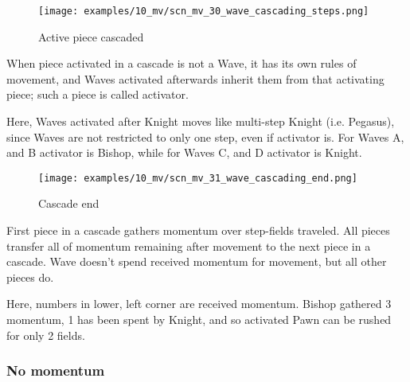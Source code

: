 \clearpage %

\vspace*{-2.1\baselineskip}
\noindent
\begin{figure}[h]
\texttt{[image: examples/10\_mv/scn\_mv\_30\_wave\_cascading\_steps.png]}
\vspace*{-1.4\baselineskip}
\caption{Active piece cascaded}
\label{fig:scn_mv_30_wave_cascading_steps}
\end{figure}

\vspace*{-0.4\baselineskip}
When piece activated in a cascade is not a Wave, it has its own rules of movement, and
Waves activated afterwards inherit them from that activating piece; such a piece is
called activator.

Here, Waves activated after Knight moves like multi-step Knight (i.e. Pegasus), since
Waves are not restricted to only one step, even if activator is. For Waves A, and B
activator is Bishop, while for Waves C, and D activator is Knight.

\clearpage %

\vspace*{-2.1\baselineskip}
\noindent
\begin{figure}[h]
\texttt{[image: examples/10\_mv/scn\_mv\_31\_wave\_cascading\_end.png]}
\vspace*{-1.3\baselineskip}
\caption{Cascade end}
\label{fig:scn_mv_31_wave_cascading_end}
\end{figure}

\vspace*{-0.3\baselineskip}
First piece in a cascade gathers momentum over step-fields traveled. All pieces
transfer all of momentum remaining after movement to the next piece in a cascade.
Wave doesn't spend received momentum for movement, but all other pieces do.

Here, numbers in lower, left corner are received momentum. Bishop gathered 3 momentum,
1 has been spent by Knight, and so activated Pawn can be rushed for only 2 fields.

\clearpage %

\subsubsection*{No momentum}
\label{sec:Miranda's veil/Wave/Cascading Waves/No momentum}

